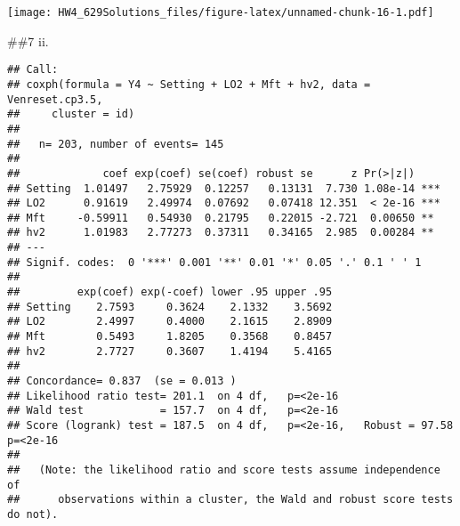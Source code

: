 \documentclass[
]{article}
\newenvironment{Shaded}{\begin{snugshade}}{\end{snugshade}}
\newcommand{\AttributeTok}[1]{\textcolor[rgb]{0.77,0.63,0.00}{#1}}
\newcommand{\CommentTok}[1]{\textcolor[rgb]{0.56,0.35,0.01}{\textit{#1}}}
\newcommand{\DecValTok}[1]{\textcolor[rgb]{0.00,0.00,0.81}{#1}}
\newcommand{\FloatTok}[1]{\textcolor[rgb]{0.00,0.00,0.81}{#1}}
\newcommand{\FunctionTok}[1]{\textcolor[rgb]{0.00,0.00,0.00}{#1}}
\newcommand{\NormalTok}[1]{#1}
\newcommand{\OtherTok}[1]{\textcolor[rgb]{0.56,0.35,0.01}{#1}}
\newcommand{\SpecialCharTok}[1]{\textcolor[rgb]{0.00,0.00,0.00}{#1}}
\newcommand{\StringTok}[1]{\textcolor[rgb]{0.31,0.60,0.02}{#1}}
\begin{document}
\texttt{[image: HW4\_629Solutions\_files/figure-latex/unnamed-chunk-16-1.pdf]}

\#\#7 ii.

\begin{Shaded}
\end{Shaded}

\begin{verbatim}
## Call:
## coxph(formula = Y4 ~ Setting + LO2 + Mft + hv2, data = Venreset.cp3.5, 
##     cluster = id)
## 
##   n= 203, number of events= 145 
## 
##             coef exp(coef) se(coef) robust se      z Pr(>|z|)    
## Setting  1.01497   2.75929  0.12257   0.13131  7.730 1.08e-14 ***
## LO2      0.91619   2.49974  0.07692   0.07418 12.351  < 2e-16 ***
## Mft     -0.59911   0.54930  0.21795   0.22015 -2.721  0.00650 ** 
## hv2      1.01983   2.77273  0.37311   0.34165  2.985  0.00284 ** 
## ---
## Signif. codes:  0 '***' 0.001 '**' 0.01 '*' 0.05 '.' 0.1 ' ' 1
## 
##         exp(coef) exp(-coef) lower .95 upper .95
## Setting    2.7593     0.3624    2.1332    3.5692
## LO2        2.4997     0.4000    2.1615    2.8909
## Mft        0.5493     1.8205    0.3568    0.8457
## hv2        2.7727     0.3607    1.4194    5.4165
## 
## Concordance= 0.837  (se = 0.013 )
## Likelihood ratio test= 201.1  on 4 df,   p=<2e-16
## Wald test            = 157.7  on 4 df,   p=<2e-16
## Score (logrank) test = 187.5  on 4 df,   p=<2e-16,   Robust = 97.58  p=<2e-16
## 
##   (Note: the likelihood ratio and score tests assume independence of
##      observations within a cluster, the Wald and robust score tests do not).
\end{verbatim}
\end{document}
